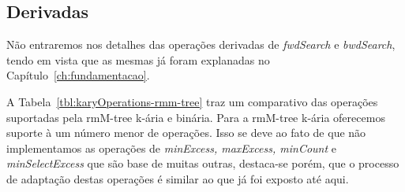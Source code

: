 \newpage
     \subsection{Derivadas}
     Não entraremos nos detalhes das operações derivadas de \textit{fwdSearch} e \textit{bwdSearch}, tendo em vista que as mesmas já foram explanadas no Capítulo~\ref{ch:fundamentacao}.  
     
     A Tabela~\ref{tbl:karyOperations-rmm-tree} traz um comparativo das operações suportadas pela rmM-tree k-ária e binária. Para a rmM-tree k-ária oferecemos suporte à um número menor de operações. Isso se deve ao fato de que não implementamos as operações de \textit{minExcess, maxExcess, minCount} e \textit{minSelectExcess} que são base de muitas outras, destaca-se porém, que o processo de adaptação destas operações é similar ao que já foi exposto até aqui.

     





